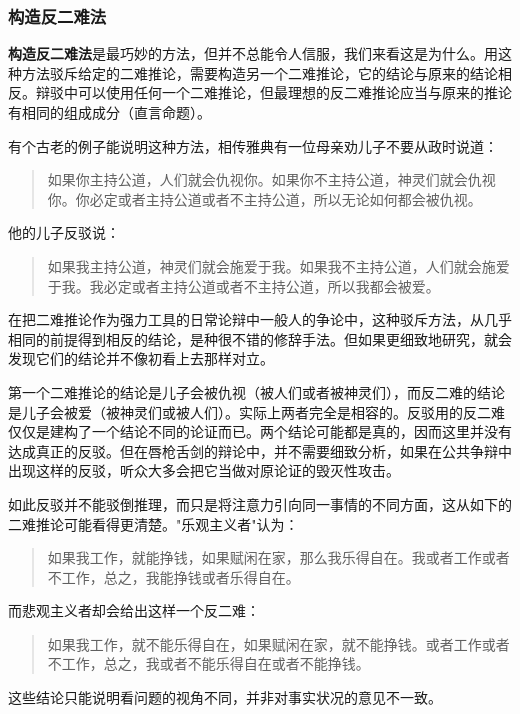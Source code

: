 \subsubsection{构造反二难法}

\textbf{构造反二难法}是最巧妙的方法，但并不总能令人信服，我们来看这是为什么。用这种方法驳斥给定的二难推论，需要构造另一个二难推论，它的结论与原来的结论相反。辩驳中可以使用任何一个二难推论，但最理想的反二难推论应当与原来的推论有相同的组成成分（直言命题）。

有个古老的例子能说明这种方法，相传雅典有一位母亲劝儿子不要从政时说道：

\begin{quote}
如果你主持公道，人们就会仇视你。如果你不主持公道，神灵们就会仇视你。你必定或者主持公道或者不主持公道，所以无论如何都会被仇视。
\end{quote}

他的儿子反驳说：

\begin{quote}
如果我主持公道，神灵们就会施爱于我。如果我不主持公道，人们就会施爱于我。我必定或者主持公道或者不主持公道，所以我都会被爱。
\end{quote}

在把二难推论作为强力工具的日常论辩中一般人的争论中，这种驳斥方法，从几乎相同的前提得到相反的结论，是种很不错的修辞手法。但如果更细致地研究，就会发现它们的结论并不像初看上去那样对立。

第一个二难推论的结论是儿子会被仇视（被人们或者被神灵们），而反二难的结论是儿子会被爱（被神灵们或被人们）。实际上两者完全是相容的。反驳用的反二难仅仅是建构了一个结论不同的论证而已。两个结论可能都是真的，因而这里并没有达成真正的反驳。但在唇枪舌剑的辩论中，并不需要细致分析，如果在公共争辩中出现这样的反驳，听众大多会把它当做对原论证的毁灭性攻击。

如此反驳并不能驳倒推理，而只是将注意力引向同一事情的不同方面，这从如下的二难推论可能看得更清楚。"乐观主义者"认为：

\begin{quote}
如果我工作，就能挣钱，如果赋闲在家，那么我乐得自在。我或者工作或者不工作，总之，我能挣钱或者乐得自在。
\end{quote}

而悲观主义者却会给出这样一个反二难：

\begin{quote}
如果我工作，就不能乐得自在，如果赋闲在家，就不能挣钱。或者工作或者不工作，总之，我或者不能乐得自在或者不能挣钱。
\end{quote}

这些结论只能说明看问题的视角不同，并非对事实状况的意见不一致。

